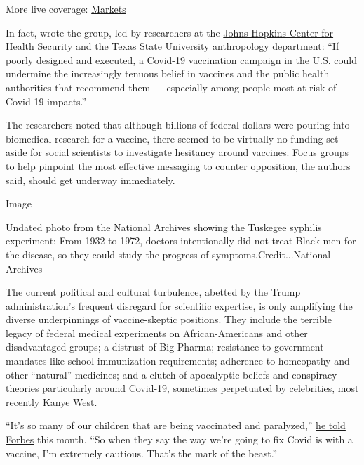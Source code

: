 More live coverage:
\href{https://www.nytimes3xbfgragh.onion/live/2020/07/31/business/stock-market-today-coronavirus?action=click\&pgtype=Article\&state=default\&region=MAIN_CONTENT_1\&context=storylines_live_updates}{Markets}

In fact, wrote the group, led by researchers at the
\href{https://www.centerforhealthsecurity.org/}{Johns Hopkins Center for
Health Security} and the Texas State University anthropology department:
``If poorly designed and executed, a Covid-19 vaccination campaign in
the U.S. could undermine the increasingly tenuous belief in vaccines and
the public health authorities that recommend them --- especially among
people most at risk of Covid-19 impacts.''

The researchers noted that although billions of federal dollars were
pouring into biomedical research for a vaccine, there seemed to be
virtually no funding set aside for social scientists to investigate
hesitancy around vaccines. Focus groups to help pinpoint the most
effective messaging to counter opposition, the authors said, should get
underway immediately.

Image

Undated photo from the National Archives showing the Tuskegee syphilis
experiment: From 1932 to 1972, doctors intentionally did not treat Black
men for the disease, so they could study the progress of
symptoms.Credit...National Archives

The current political and cultural turbulence, abetted by the Trump
administration's frequent disregard for scientific expertise, is only
amplifying the diverse underpinnings of vaccine-skeptic positions. They
include the terrible legacy of federal medical experiments on
African-Americans and other disadvantaged groups; a distrust of Big
Pharma; resistance to government mandates like school immunization
requirements; adherence to homeopathy and other ``natural'' medicines;
and a clutch of apocalyptic beliefs and conspiracy theories particularly
around Covid-19, sometimes perpetuated by celebrities, most recently
Kanye West.

``It's so many of our children that are being vaccinated and
paralyzed,''
\href{https://www.forbes.com/sites/randalllane/2020/07/08/kanye-west-says-hes-done-with-trump-opens-up-about-white-house-bid-damaging-biden-and-everything-in-between/\#6774579e47aa}{he
told Forbes} this month. ``So when they say the way we're going to fix
Covid is with a vaccine, I'm extremely cautious. That's the mark of the
beast.''

